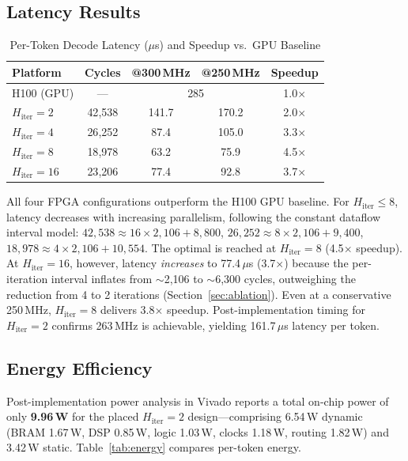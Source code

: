 \documentclass[conference]{IEEEtran}
\begin{document}
\subsection{Latency Results}

\begin{table}[t]
\centering
\caption{Per-Token Decode Latency ($\mu$s) and Speedup vs.\ GPU Baseline}
\label{tab:latency}
\begin{tabular}{lcccc}
\toprule
\textbf{Platform} & \textbf{Cycles} & \textbf{@300\,MHz} & \textbf{@250\,MHz} & \textbf{Speedup} \\
\midrule
H100 (GPU) & --- & \multicolumn{2}{c}{285} & 1.0$\times$ \\
\midrule
$H_{\mathrm{iter}}{=}2$ & 42{,}538 & 141.7 & 170.2 & 2.0$\times$ \\
$H_{\mathrm{iter}}{=}4$ & 26{,}252 & 87.4 & 105.0 & 3.3$\times$ \\
$H_{\mathrm{iter}}{=}8$ & 18{,}978 & 63.2 & 75.9 & 4.5$\times$ \\
$H_{\mathrm{iter}}{=}16$ & 23{,}206 & 77.4 & 92.8 & 3.7$\times$ \\
\bottomrule
\end{tabular}
\end{table}

All four FPGA configurations outperform the H100 GPU baseline.
For $H_{\mathrm{iter}} \leq 8$, latency decreases with increasing
parallelism, following the constant dataflow interval model:
$42{,}538 \approx 16 \times 2{,}106 + 8{,}800$,
$26{,}252 \approx 8 \times 2{,}106 + 9{,}400$,
$18{,}978 \approx 4 \times 2{,}106 + 10{,}554$.
The optimal is reached at $H_{\mathrm{iter}}{=}8$ (4.5$\times$ speedup).
At $H_{\mathrm{iter}}{=}16$, however, latency \emph{increases} to
77.4\,$\mu$s (3.7$\times$) because the per-iteration interval inflates
from $\sim$2{,}106 to $\sim$6{,}300 cycles, outweighing the reduction
from 4 to 2 iterations (Section~\ref{sec:ablation}).
Even at a conservative 250\,MHz, $H_{\mathrm{iter}}{=}8$ delivers
3.8$\times$ speedup. Post-implementation timing for
$H_{\mathrm{iter}}{=}2$ confirms 263\,MHz is achievable, yielding
161.7\,$\mu$s latency per token.

\subsection{Energy Efficiency}

Post-implementation power analysis in Vivado reports a total on-chip
power of only \textbf{9.96\,W} for the placed $H_{\mathrm{iter}}{=}2$
design---comprising 6.54\,W dynamic (BRAM 1.67\,W, DSP 0.85\,W, logic
1.03\,W, clocks 1.18\,W, routing 1.82\,W) and 3.42\,W static.
Table~\ref{tab:energy} compares per-token energy.
\end{document}
